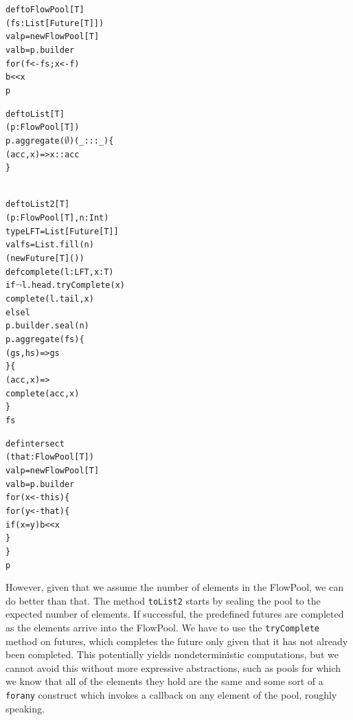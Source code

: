 \documentclass[runningheads,a4paper]{llncs}
\begin{document}
\noindent
\begin{minipage}[b]{3.6 cm}
\begin{alltt}
{\scriptsize
def toFlowPool[T]
  (fs: List[Future[T]])
  val p = new FlowPool[T]
  val b = p.builder
  for (f <- fs; x <- f)
    b << x
  p


def toList[T]
  (p: FlowPool[T])
  p.aggregate(\(\emptyset\))(_ ::: _) \{
    (acc, x) => x :: acc
  \}



}
\end{alltt}
\end{minipage}
\begin{minipage}[b]{3.9 cm}
\begin{alltt}
{\scriptsize
def toList2[T]
  (p: FlowPool[T], n: Int)
  type LFT = List[Future[T]]
  val fs = List.fill(n)
    (new Future[T]())
  def complete(l: LFT, x: T)
    if \(\lnot\)l.head.tryComplete(x)
      complete(l.tail, x)
    else l
  p.builder.seal(n)
  p.aggregate(fs) \{
    (gs, hs) => gs
  \} \{
    (acc, x) =>
    complete(acc, x)
  \}
  fs
}
\end{alltt}
\end{minipage}
\begin{minipage}[b]{4.7 cm}
\begin{alltt}
{\scriptsize
def intersect
  (that: FlowPool[T])
  val p = new FlowPool[T]
  val b = p.builder
  for (x <- this) \{
    for (y <- that) \{
      if (x = y) b << x
    \}
 \}
  p



}
\end{alltt}
\end{minipage}



However, given that we assume the number of elements in
the FlowPool, we can do better than that.
The method \verb=toList2= starts by sealing the pool to
the expected number of elements.
If successful, the predefined futures are completed
as the elements arrive into the FlowPool.
We have to use the \verb=tryComplete= method on
futures, which completes the future only given that
it has not already been completed.
This potentially yields nondeterministic computations,
but we cannot avoid this without more expressive
abstractions, such as pools for which we know that
all of the elements they hold are the same and some
sort of a \verb=forany= construct which invokes a callback
on any element of the pool, roughly speaking.
\end{document}
